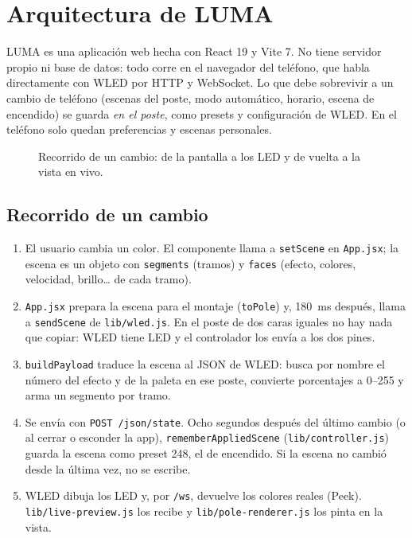 \chapter{Arquitectura de LUMA}\label{cap:arquitectura}

LUMA es una aplicación web hecha con React 19 y Vite 7. No tiene servidor propio ni base de datos: todo corre en el navegador del teléfono, que habla directamente con WLED por HTTP y WebSocket. Lo que debe sobrevivir a un cambio de teléfono (escenas del poste, modo automático, horario, escena de encendido) se guarda \emph{en el poste}, como presets y configuración de WLED. En el teléfono solo quedan preferencias y escenas personales.

\begin{figure}[H]\centering
\resizebox{\linewidth}{!}{}
\caption{Recorrido de un cambio: de la pantalla a los LED y de vuelta a la vista en vivo.}\label{fig:flujo}
\end{figure}

\section{Recorrido de un cambio}

\begin{enumerate}
\item El usuario cambia un color. El componente llama a \texttt{setScene} en \texttt{App.jsx}; la escena es un objeto con \texttt{segments} (tramos) y \texttt{faces} (efecto, colores, velocidad, brillo… de cada tramo).
\item \texttt{App.jsx} prepara la escena para el montaje (\texttt{toPole}) y, 180~ms después, llama a \texttt{sendScene} de \texttt{lib/wled.js}. En el poste de dos caras iguales no hay nada que copiar: WLED tiene  LED y el controlador los envía a los dos pines.
\item \texttt{buildPayload} traduce la escena al JSON de WLED: busca por nombre el número del efecto y de la paleta en ese poste, convierte porcentajes a 0--255 y arma un segmento por tramo.
\item Se envía con \texttt{POST /json/state}. Ocho segundos después del último cambio (o al cerrar o esconder la app), \texttt{rememberAppliedScene} (\texttt{lib/controller.js}) guarda la escena como preset 248, el de encendido. Si la escena no cambió desde la última vez, no se escribe.
\item WLED dibuja los LED y, por \texttt{/ws}, devuelve los colores reales (Peek). \texttt{lib/live-preview.js} los recibe y \texttt{lib/pole-renderer.js} los pinta en la vista.
\end{enumerate}

